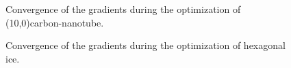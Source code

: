 \documentclass[prl,aps,preprint,superbib,12pt]{revtex4}
\begin{document}
\begin{figure}[h]
\caption{Convergence of the gradients during the optimization
of (10,0)carbon-nanotube.}
\label{NANO-grads}
\end{figure}

\begin{figure}[h]
\caption{Convergence of the gradients during the optimization 
of hexagonal ice.}
\label{ICE-grads}
\end{figure}
\end{document}
